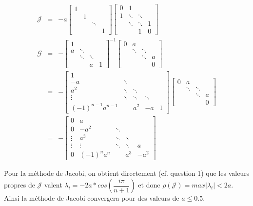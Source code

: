 \begin{eqnarray}
\mathcal{J} &=& - a
\left[ 
\begin{array}{cccc}
1 & & &\\
 & 1 & &\\
 & & \ddots & \\
  & & & 1
\end{array} 
\right] 
\left[ 
\begin{array}{cccc}
0 & 1& &\\
1 & \ddots & \ddots &\\
 & \ddots & \ddots & 1 \\
  & & 1 & 0
\end{array} 
\right]\\
\mathcal{G} & = & -  
\left[ 
\begin{array}{cccc}
1 & & &\\
a & \ddots &  &\\
 & \ddots & \ddots  &  \\
  & & a & 1
\end{array} 
\right] ^{-1}
\left[ 
\begin{array}{cccc}
0 & a & &\\
 & \ddots &  \ddots &\\
 &  & \ddots  & a \\
  & &  & 0
\end{array} 
\right] 
\\
&=& -
\left[ 
\begin{array}{ccccc}
1 & & & &\\
-a & \ddots &  & &\\
a^2 & \ddots & \ddots  &  &\\
 \vdots & \ddots & \ddots & \ddots & \\
(-1)^{n-1}a^{n-1} & & a^2 & -a & 1
\end{array} 
\right]
\left[ 
\begin{array}{cccc}
0 & a & &\\
 & \ddots &  \ddots &\\
 &  & \ddots  & a \\
  & &  & 0
\end{array} 
\right]\\
&=& -
\left[ 
\begin{array}{ccccc}
0 & a & & &\\
0 & -a^2 & \ddots  & &\\
\vdots & a^3 & \ddots & \ddots  &\\
\vdots & \vdots & \ddots & \ddots  & a \\
0 & (-1)^n a^n & & a^3 & -a^2
\end{array} 
\right]
\end{eqnarray}

Pour la méthode de Jacobi, on obtient directement (cf. question 1) que les valeurs propres de $\mathcal{J}$ valent $\lambda _i = -2a * cos(\dfrac{i \pi}{n+1})$ et donc $\rho(\mathcal{J}) = max |\lambda _i| < 2a$. Ainsi la méthode de Jacobi convergera pour des valeurs de $a \leq 0.5$. 


